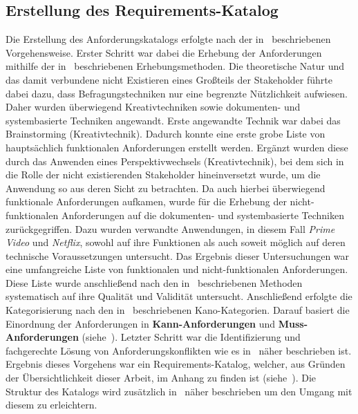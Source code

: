 \subsection{Erstellung des Requirements-Katalog}\label{subsec:requirements}
Die Erstellung des Anforderungskatalogs erfolgte nach der in~ beschriebenen Vorgehensweise.
Erster Schritt war dabei die Erhebung der Anforderungen mithilfe der in~ beschriebenen
Erhebungsmethoden.
Die theoretische Natur und das damit verbundene nicht Existieren eines Großteils der Stakeholder führte dabei dazu, dass
Befragungstechniken nur eine begrenzte Nützlichkeit aufwiesen.
Daher wurden überwiegend Kreativtechniken sowie dokumenten- und systembasierte Techniken angewandt.
Erste angewandte Technik war dabei das Brainstorming (Kreativtechnik).
Dadurch konnte eine erste grobe Liste von hauptsächlich funktionalen Anforderungen erstellt werden.
Ergänzt wurden diese durch das Anwenden eines Perspektivwechsels (Kreativtechnik), bei dem sich in die Rolle der nicht existierenden Stakeholder
hineinversetzt wurde, um die Anwendung so aus deren Sicht zu betrachten.
Da auch hierbei überwiegend funktionale Anforderungen aufkamen, wurde für die Erhebung der nicht-funktionalen Anforderungen
auf die dokumenten- und systembasierte Techniken zurückgegriffen.
Dazu wurden verwandte Anwendungen, in diesem Fall \textit{Prime Video} und \textit{Netflix}, sowohl auf ihre Funktionen als auch
soweit möglich auf deren technische Voraussetzungen untersucht.
Das Ergebnis dieser Untersuchungen war eine umfangreiche Liste von funktionalen und nicht-funktionalen Anforderungen.
Diese Liste wurde anschließend nach den in~ beschriebenen
Methoden systematisch auf ihre Qualität und Validität untersucht.
Anschließend erfolgte die Kategorisierung nach den in~ beschriebenen Kano-Kategorien.
Darauf basiert die Einordnung der Anforderungen in \textbf{Kann-Anforderungen} und \textbf{Muss-Anforderungen}
(siehe~).
Letzter Schritt war die Identifizierung und fachgerechte Lösung von Anforderungskonflikten wie es in~
näher beschrieben ist.
Ergebnis dieses Vorgehens war ein Requirements-Katalog, welcher, aus Gründen der Übersichtlichkeit dieser Arbeit, im Anhang
zu finden ist (siehe~).
Die Struktur des Katalogs wird zusätzlich in~ näher beschrieben um den Umgang mit diesem zu
erleichtern.

